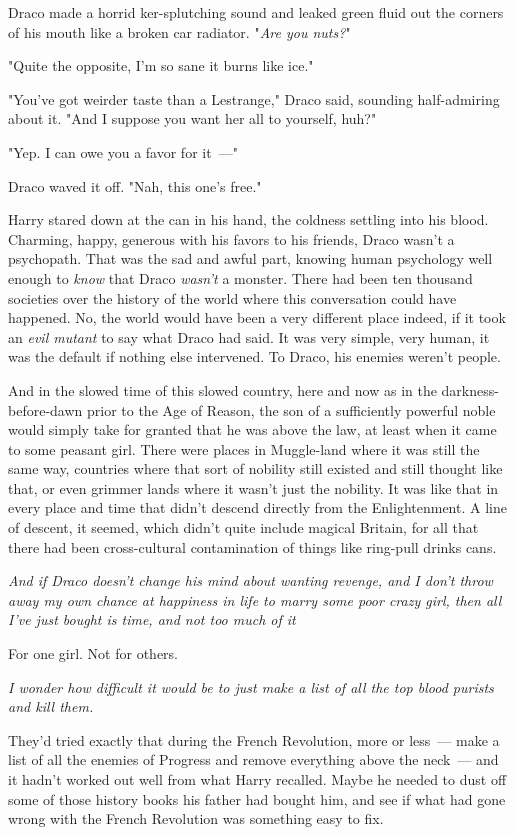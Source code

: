 Draco made a horrid ker-splutching sound and leaked green fluid out the corners
of his mouth like a broken car radiator. "\emph{Are you nuts?}"

"Quite the opposite, I'm so sane it burns like ice."

"You've got weirder taste than a Lestrange," Draco said, sounding half-admiring
about it. "And I suppose you want her all to yourself, huh?"

"Yep. I can owe you a favor for it~---"

Draco waved it off. "Nah, this one's free."

Harry stared down at the can in his hand, the coldness settling into his blood.
Charming, happy, generous with his favors to his friends, Draco wasn't a
psychopath. That was the sad and awful part, knowing human psychology well
enough to \emph{know} that Draco \emph{wasn't} a monster. There had been ten
thousand societies over the history of the world where this conversation could
have happened. No, the world would have been a very different place indeed, if
it took an \emph{evil mutant} to say what Draco had said. It was very simple,
very human, it was the default if nothing else intervened. To Draco, his
enemies weren't people.

And in the slowed time of this slowed country, here and now as in the
darkness-before-dawn prior to the Age of Reason, the son of a sufficiently
powerful noble would simply take for granted that he was above the law, at
least when it came to some peasant girl. There were places in Muggle-land where
it was still the same way, countries where that sort of nobility still existed
and still thought like that, or even grimmer lands where it wasn't just the
nobility. It was like that in every place and time that didn't descend directly
from the Enlightenment. A line of descent, it seemed, which didn't quite
include magical Britain, for all that there had been cross-cultural
contamination of things like ring-pull drinks cans.

\emph{And if Draco doesn't change his mind about wanting revenge, and I don't
throw away my own chance at happiness in life to marry some poor crazy girl,
then all I've just bought is time, and not too much of it{\el}}

For one girl. Not for others.

\emph{I wonder how difficult it would be to just make a list of all the top
blood purists and kill them.}

They'd tried exactly that during the French Revolution, more or less~--- make a
list of all the enemies of Progress and remove everything above the neck~--- and
it hadn't worked out well from what Harry recalled. Maybe he needed to dust off
some of those history books his father had bought him, and see if what had gone
wrong with the French Revolution was something easy to fix.


